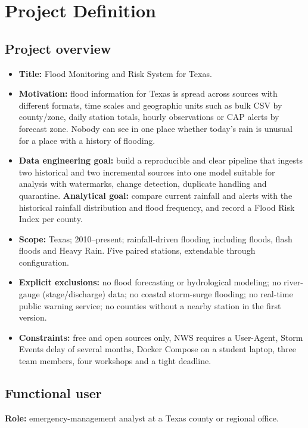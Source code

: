 \documentclass[11pt,letterpaper]{article}
\begin{document}
\section{Project Definition}

\subsection{Project overview}
\begin{itemize}
  \item \textbf{Title:} Flood Monitoring and Risk System for Texas.
  \item \textbf{Motivation:} flood information for Texas is spread across sources with different formats, time scales and geographic units such as bulk CSV by county/zone, daily station totals, hourly observations or CAP alerts by forecast zone. Nobody can see in one place whether today's rain is unusual for a place with a history of flooding.
  \item \textbf{Data engineering goal:} build a reproducible and clear pipeline that ingests two historical and two incremental sources into one model suitable for analysis with watermarks, change detection, duplicate handling and quarantine. \textbf{Analytical goal:} compare current rainfall and alerts with the historical rainfall distribution and flood frequency, and record a Flood Risk Index per county.
  \item \textbf{Scope:} Texas; 2010--present; rainfall-driven flooding  including floods, flash floods and  Heavy Rain. Five paired stations, extendable through configuration.
  \item \textbf{Explicit exclusions:} no flood forecasting or hydrological modeling; no river-gauge (stage/discharge) data; no coastal storm-surge flooding; no real-time public warning service; no counties without a nearby station in the first version.
  \item \textbf{Constraints:} free and open sources only, NWS requires a User-Agent, Storm Events delay of several months, Docker Compose on a student laptop, three team members, four workshops and a tight deadline.
\end{itemize}

\subsection{Functional user}
\textbf{Role:} emergency-management analyst at a Texas county or regional office.\\
\end{document}
